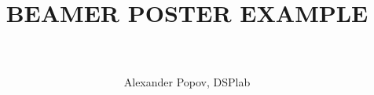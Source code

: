 \documentclass[xcolor=dvipsnames]{beamer}
\title{\Large ~\\ BEAMER POSTER EXAMPLE \\~}
\author{\large Alexander Popov, DSPlab}
\institute{}
\date{}
\begin{document}
\begin{frame}{}

\begin{beamercolorbox}{}
\maketitle
\end{beamercolorbox}



\end{frame}
\end{document}
